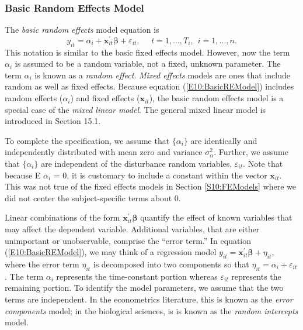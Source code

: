 \subsubsection*{Basic Random Effects Model}

The \emph{basic random effects} model equation is
\begin{equation}\label{E10:BasicREModel}
y_{it} = \alpha_i + \mathbf{x}_{it}^{\prime} \boldsymbol \beta +
\varepsilon_{it},~~~~~~ t=1, \ldots, T_i,~~ i=1, \ldots, n .
\end{equation}
This notation is similar to the basic fixed effects model. However,
now the term $\alpha_i$ is assumed to be a random variable, not a
fixed, unknown parameter. The term $\alpha_i$ is known as a
\emph{random effect}. \emph{Mixed effects} models are ones that
include random as well as fixed effects. Because equation
(\ref{E10:BasicREModel}) includes random effects ($\alpha_i$) and
fixed effects ($\mathbf{x}_{it}$), the basic random effects model is
a special case of the \emph{mixed linear model}. The general mixed
linear model is introduced in Section 15.1.

To complete the specification, we assume that $\{\alpha_i \}$  are
identically and independently distributed with mean zero and
variance $\sigma_{\alpha}^2$. Further, we assume that $\{\alpha_i
\}$ are independent of the disturbance random variables,
$\varepsilon_{it}$. Note that because E $\alpha_i$ = 0, it is
customary to include a constant within the vector $\mathbf{x}_{it}$.
This was not true of the fixed effects models in Section
\ref{S10:FEModels} where we did not center the subject-specific
terms about 0.

Linear combinations of the form $\mathbf{x}_{it}^{\prime}
\boldsymbol \beta $ quantify the effect of known variables that may
affect the dependent variable. Additional variables, that are either
unimportant or unobservable, comprise the ``error term.'' In
equation (\ref{E10:BasicREModel}), we may think of a regression
model $y_{it} = \mathbf{x}_{it}^{\prime} \boldsymbol \beta +
\eta_{it},$ where the error term $\eta_{it}$ is decomposed into two
components so that $\eta_{it}= \alpha_i + \varepsilon_{it}$. The
term $\alpha_i$ represents the time-constant portion whereas
$\varepsilon_{it}$ represents the remaining portion. To identify the
model parameters, we assume that the two terms are independent. In
the econometrics literature, this is known as the \emph{error
components} model; in the biological sciences, is is known as the
\emph{random intercepts} model.

